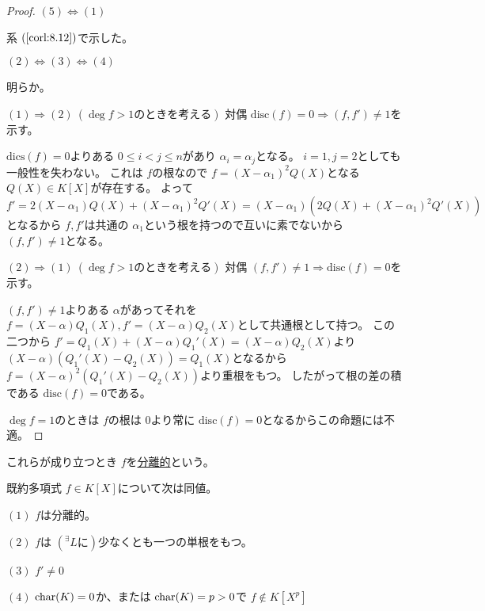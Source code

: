 \documentclass[../master_galois_theory]{subfiles}
\begin{document}
\begin{proof}
  $(5) \Leftrightarrow (1)$

  系 $(\mathrm{\ref{corl:8.12}})$で示した。

  $(2) \Leftrightarrow (3) \Leftrightarrow (4)$

  明らか。

  $(1) \Rightarrow (2) \  (\deg f > 1のときを考える)$
  対偶 $\mathrm{disc}(f) = 0 \Rightarrow (f,f') \neq 1$を示す。

  $\mathrm{dics}(f) = 0$よりある $0 \leq i < j \leq n$があり
  $\alpha_i = \alpha_j$となる。
  $i = 1 , j = 2$としても一般性を失わない。
  これは $f$の根なので $f = (X - \alpha_1)^2 Q(X)$となる $Q(X) \in K[X]$が存在する。
  よって $f' = 2(X - \alpha_1)Q(X) + (X - \alpha_1)^2 Q'(X) = (X - \alpha_1)(2 Q(X) + (X - \alpha_1)^2 Q'(X))$となるから
  $f , f'$は共通の $\alpha_1$という根を持つので互いに素でないから
  $(f,f') \neq 1$となる。

  $(2) \Rightarrow (1) \  (\deg f > 1のときを考える)$
  対偶 $(f,f') \neq 1 \Rightarrow \mathrm{disc}(f) = 0$を示す。

  $(f,f') \neq 1$よりある $\alpha$があってそれを
  $f = (X - \alpha) Q_1(X) , f' = (X - \alpha) Q_2(X)$として共通根として持つ。
  この二つから $f' = Q_1(X) + (X - \alpha)Q_1'(X) = (X - \alpha) Q_2(X)$より
  $(X - \alpha)(Q_1'(X) - Q_2(X)) = Q_1(X)$となるから
  $f = (X - \alpha)^2 (Q_1'(X) - Q_2(X))$より重根をもつ。
  したがって根の差の積である $\mathrm{disc}(f) = 0$である。

  $\deg f = 1$のときは $f$の根は $0$より常に $\mathrm{disc}(f) = 0$となるからこの命題には不適。
\end{proof}

\begin{defi}
  これらが成り立つとき $f$を\underline{分離的}という。
\end{defi}

\begin{prop}
  既約多項式 $f \in K[X]$について次は同値。

  $(1)$
  $f$は分離的。

  $(2)$
  $f$は $({}^\exists L に)$少なくとも一つの単根をもつ。

  $(3)$
  $f' \neq 0$

  $(4)$
  $\mathrm{char}(K) = 0$か、または $\mathrm{char}(K) = p > 0$で $f \notin K[X^p]$
\end{prop}
\end{document}
